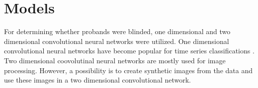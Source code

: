 \chapter{Models}
For determining whether probands were blinded, one dimensional and two dimensional convolutional neural networks were utilized. One dimensional convolutional neural networks have become popular for time series classifications . Two dimensional coovolutinal neural networks are mostly used for image processing. However, a possibility is to create synthetic images from the data and use these images in a two dimensional convolutional network. 